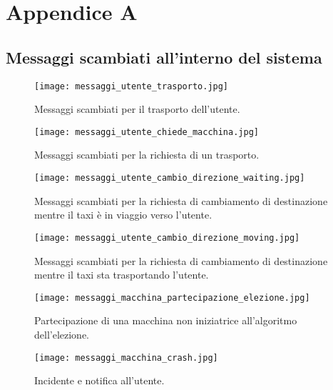 
\chapter{Appendice A}
  

\section{Messaggi scambiati all'interno del sistema} \label{messaggi_scambiati_appendix}

\begin{figure}[htbp]
	\centering
	\texttt{[image: messaggi\_utente\_trasporto.jpg]}
	\caption{Messaggi scambiati per il trasporto dell'utente.}
	\label{fig:messaggi_utente_trasporto}
\end{figure}

\begin{figure}[htbp]
	\centering
	\texttt{[image: messaggi\_utente\_chiede\_macchina.jpg]}
	\caption{Messaggi scambiati per la richiesta di un trasporto.}
	\label{fig:messaggi_utente_chiede_macchina}
\end{figure}

\begin{figure}[htbp]
	\centering
	\texttt{[image: messaggi\_utente\_cambio\_direzione\_waiting.jpg]}
	\caption{Messaggi scambiati per la richiesta di cambiamento di destinazione mentre il taxi è in viaggio verso l'utente.}
	\label{fig:messaggi_utente_cambio_direzione_waiting}
\end{figure}

\begin{figure}[htbp]
	\centering
	\texttt{[image: messaggi\_utente\_cambio\_direzione\_moving.jpg]}
	\caption{Messaggi scambiati per la richiesta di cambiamento di destinazione mentre il taxi sta trasportando l'utente.}
	\label{fig:messaggi_utente_cambio_direzione_moving}
\end{figure}

\begin{figure}[htbp]
	\centering
	\texttt{[image: messaggi\_macchina\_partecipazione\_elezione.jpg]}
	\caption{Partecipazione di una macchina non iniziatrice all'algoritmo dell'elezione.}
	\label{fig:messaggi_macchina_partecipazione_elezione}
\end{figure}

\begin{figure}[htbp]
	\centering
	\texttt{[image: messaggi\_macchina\_crash.jpg]}
	\caption{Incidente e notifica all'utente.}
	\label{fig:messaggi_macchina_crash}
\end{figure}

